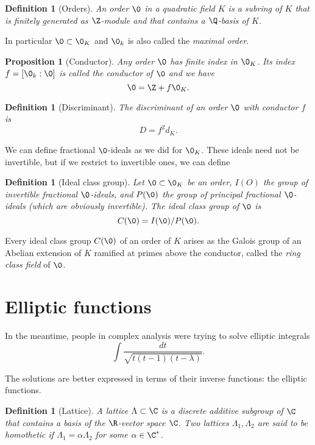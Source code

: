 \documentclass{article}
\newtheorem{definition}[theorem]{Definition}
\newtheorem{proposition}[theorem]{Proposition}
\begin{document}
\begin{definition}[Orders]
  An \emph{order} $\0$ in a quadratic field $K$ is a subring of $K$
  that is finitely generated as $\Z$-module and that contains a
  $\Q$-basis of $K$.
\end{definition}

In particular $\0\subset\0_K$ and $\0_k$ is also called the
\emph{maximal order}.

\begin{proposition}[Conductor]
  Any order $\0$ has finite index in $\0_K$. Its index $f=[\0_k:\0]$
  is called the \emph{conductor of $\0$} and we have
  \[\0 = \Z + f\0_K.\]
\end{proposition}

\begin{definition}[Discriminant]
  The \emph{discriminant} of an order $\0$ with conductor $f$ is
  \[D = f^2d_K.\]
\end{definition}

We can define fractional $\0$-ideals as we did for $\0_K$. These
ideals need not be invertible, but if we restrict to invertible ones,
we can define

\begin{definition}[Ideal class group]
  Let $\0\subset\0_K$ be an order, $I(O)$ the group of invertible
  fractional $\0$-ideals, and $P(\0)$ the group of principal
  fractional $\0$-ideals (which are obviously invertible). The
  \emph{ideal class group} of $\0$ is
  \[C(\0) = I(\0)/P(\0).\]
\end{definition}

Every ideal class group $C(\0)$ of an order of $K$ arises as the
Galois group of an Abelian extension of $K$ ramified at primes above
the conductor, called the \emph{ring class field} of $\0$.


\section{Elliptic functions}

In the meantime, people in complex analysis were trying to solve
elliptic integrals
\begin{equation}
  \label{eq:5}
  \int\frac{dt}{\sqrt{t(t-1)(t-\lambda)}}.
\end{equation}

The solutions are better expressed in terms of their inverse
functions: the elliptic functions.

\begin{definition}[Lattice]
  A \emph{lattice} $\Lambda\subset\C$ is a discrete additive subgroup
  of $\C$ that contains a basis of the $\R$-vector space $\C$. Two
  lattices $\Lambda_1,\Lambda_2$ are said to be \emph{homothetic} if
  $\Lambda_1=\alpha\Lambda_2$ for some $\alpha\in\C^{\ast}$.
\end{definition}
\end{document}
